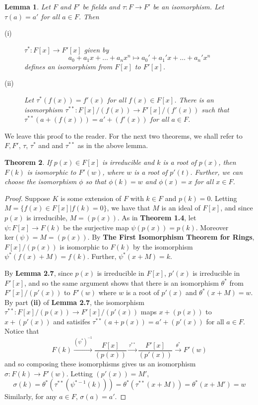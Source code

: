 \documentclass[12pt,leqno]{article}
\numberwithin{equation}{section}
\theoremstyle{plain}
\newtheorem{thm}{Theorem}[section]
\newtheorem{lem}[thm]{Lemma}
\theoremstyle{definition}
\theoremstyle{remark}
\begin{document}
\begin{lem}Let $F$ and $F'$ be fields and $\tau:F\to F'$ be an isomorphism. Let $\tau(a)=a'$ for all $a\in F$. Then
\begin{description}
 \item [(i)] $\tau^*:F[x]\to F'[x]$ given by \[a_0+a_1x+\hdots+a_nx^n\mapsto a_0'+a_1'x+\hdots+a_n'x^n\] defines an isomorphism from $F[x]$ to $F'[x]$.
 \item [(ii)] Let $\tau^*(f(x))=f'(x)$ for all $f(x)\in F[x]$. There is an isomorphism $\tau^{**}:F[x]/(f(x))\to F'[x]/(f'(x))$ such that $\tau^{**}(a+(f(x)))=a'+(f'(x))$ for all $a\in F$.
\end{description}
\end{lem}

We leave this proof to the reader. For the next two theorems, we shall refer to $F, F'$, $\tau$, $\tau^*$ and and $\tau^{**}$ as in the above lemma.

\begin{thm}
 If $p(x)\in F[x]$ is irreducible and $k$ is a root of $p(x)$, then $F(k)$ is isomorphic to $F'(w)$, where $w$ is a root of $p'(t)$. Further, we can choose the isomorphism $\phi$ so that $\phi(k)=w$ and $\phi(x)=x$ for all $x\in F$.  
\end{thm}

\begin{proof}
 Suppose $K$ is some extension of $F$ with $k\in F$ and $p(k)=0$. Letting $M=\{f(x)\in F[x]|f(k)=0\}$, we have that $M$ is an ideal of $F[x]$, and since $p(x)$ is irreducible, $M=(p(x))$. As in \textbf{Theorem 1.4}, let $\psi:F[x]\to F(k)$ be the surjective map $\psi(p(x))=p(k)$. Moreover $\text{ker}(\psi)=M=(p(x))$. By \textbf{The First Isomorphism Theorem for Rings}, $F[x]/(p(x))$ is isomorphic to $F(k)$ by the isomorphism $\psi^*(f(x)+M)=f(k)$. Further, $\psi^*(x+M)=k$.

By \textbf{Lemma 2.7}, since $p(x)$ is irreducible in $F[x]$, $p'(x)$ is irreducible in $F'[x]$, and so the same argument shows that there is an isomorphism $\theta^*$ from $F'[x]/(p'(x))$ to $F'(w)$ where $w$ is a root of $p'(x)$ and $\theta^*(x+M)=w$. By part \textbf{(ii)} of \textbf{Lemma 2.7}, the isomorphism $\tau^{**}:F[x]/(p(x))\to F'[x]/(p'(x))$ maps $x+(p(x))$ to $x+(p'(x))$ and satisifes $\tau^{**}(a+p(x))=a'+(p'(x))$ for all $a\in F$. Notice that \[F(k)\xrightarrow{(\psi^*)^{-1}}\frac{F[x]}{(p(x))}\xrightarrow{\tau^{**}}\frac{F'[x]}{(p'(x))}\xrightarrow{\theta^*}F'(w)\] and so composing these isomorphisms gives us an isomorphism $\sigma:F(k)\to F'(w)$. Letting $(p'(x))=M'$, \[\sigma(k)=\theta^*(\tau^{**}(\psi^{*-1}(k)))=\theta^*(\tau^{**}(x+M))=\theta^*(x+M')=w\] Similarly, for any $a\in F$, $\sigma(a)=a'$.
\end{proof}
\end{document}
